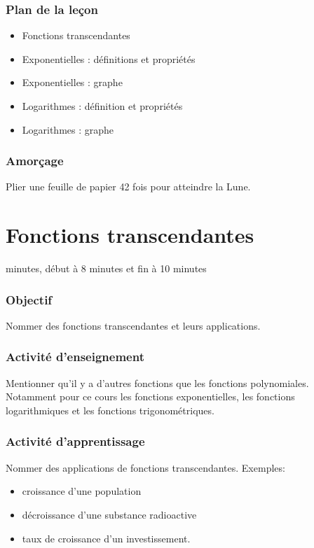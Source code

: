 \documentclass[12pt]{article}
\begin{document}
\subsubsection*{\faList{} Plan de la leçon}
\begin{itemize}
    \item Fonctions transcendantes
    \item Exponentielles : définitions et propriétés
    \item Exponentielles : graphe
    \item Logarithmes : définition et propriétés
    \item Logarithmes : graphe
\end{itemize}
\subsubsection*{\faSurprise[regular]{} Amorçage}
Plier une feuille de papier 42 fois pour atteindre la Lune.

\clearpage
\section{Fonctions transcendantes}
 minutes, début à 8 minutes et fin à 10 minutes
\subsubsection*{\faBullseye{} Objectif}
Nommer des fonctions transcendantes et leurs applications.
\subsubsection*{\faChalkboardTeacher{} Activité d'enseignement}
Mentionner qu'il y a d'autres fonctions que les fonctions polynomiales. Notamment pour ce cours les fonctions exponentielles, les fonctions logarithmiques et les fonctions trigonométriques.
\subsubsection*{\faCalculator{} Activité d'apprentissage}
Nommer des applications de fonctions transcendantes. Exemples: 
\begin{itemize}
\item croissance d'une population
\item décroissance d'une substance radioactive
\item taux de croissance d'un investissement.
\end{itemize}
\end{document}
